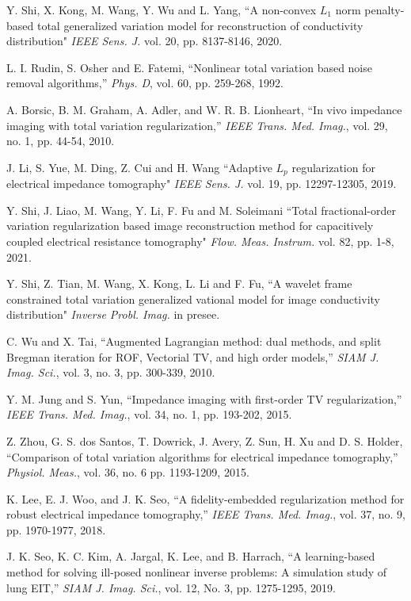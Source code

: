 \documentclass[lettersize,journal]{IEEEtran}
\begin{document}
\begin{thebibliography}{00}
 Y. Shi, X. Kong, M. Wang, Y. Wu and L. Yang, ``A non-convex $L_1$ norm penalty-based total generalized variation model for reconstruction of conductivity distribution" \emph{IEEE Sens. J.} vol. 20, pp. 8137-8146, 2020.

 L. I. Rudin, S. Osher and E. Fatemi, ``Nonlinear total variation based noise removal algorithms,'' \emph{Phys. D}, vol. 60, pp. 259-268, 1992.

  A. Borsic, B. M. Graham, A. Adler, and W. R. B. Lionheart, ``In vivo impedance imaging with total variation regularization,'' \emph{IEEE Trans. Med. Imag.}, vol. 29, no. 1, pp. 44-54, 2010.

 J. Li, S. Yue, M. Ding, Z. Cui and H. Wang ``Adaptive $L_p$ regularization for electrical impedance tomography" \emph{IEEE Sens. J.} vol. 19, pp. 12297-12305, 2019.

 Y. Shi, J. Liao, M. Wang, Y. Li, F. Fu and M. Soleimani ``Total fractional-order variation regularization based image reconstruction method for capacitively coupled electrical resistance tomography" \emph{Flow. Meas. Instrum.} vol. 82, pp. 1-8, 2021.

 Y. Shi, Z. Tian, M. Wang, X. Kong, L. Li and F. Fu, ``A wavelet frame constrained total variation generalized vational model for image conductivity distribution" \emph{Inverse Probl. Imag.} in presee.

 C. Wu and X. Tai, ``Augmented Lagrangian method: dual methods, and split Bregman iteration for ROF, Vectorial TV, and high order models,'' \emph{SIAM J. Imag. Sci.}, vol. 3, no. 3, pp. 300-339, 2010.

 Y. M. Jung and S. Yun, ``Impedance imaging with first-order TV regularization,'' \emph{IEEE Trans. Med. Imag.}, vol. 34, no. 1, pp. 193-202, 2015.

 Z. Zhou, G. S. dos Santos, T. Dowrick, J. Avery, Z. Sun, H. Xu and D. S. Holder, ``Comparison of total variation algorithms for electrical impedance tomography,'' \emph{Physiol. Meas.}, vol. 36, no. 6 pp. 1193-1209, 2015.


 K. Lee, E. J. Woo, and J. K. Seo, ``A fidelity-embedded regularization method for robust electrical impedance tomography,'' \emph{IEEE Trans. Med. Imag.}, vol. 37, no. 9, pp. 1970-1977, 2018.

 J. K. Seo, K. C. Kim, A. Jargal, K. Lee, and B. Harrach, ``A learning-based method for solving ill-posed nonlinear inverse problems: A simulation study of lung EIT,'' \emph{SIAM J. Imag. Sci.}, vol. 12, No. 3, pp. 1275-1295, 2019.


\end{thebibliography}
\end{document}
